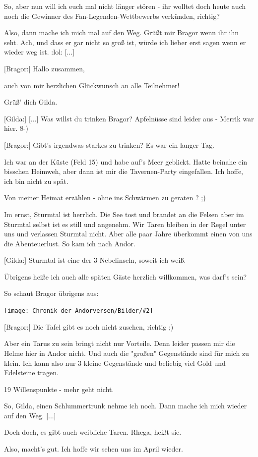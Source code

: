 \documentclass[10pt, a4paper, oneside]{book}
\newcommand{\bildmitts}[2][height=0.32\textwidth,width=0.48\textwidth,keepaspectratio]{%
    \begin{center}
        \texttt{[image: Chronik der Andorversen/Bilder/\#2]}
    \end{center}
}
\begin{document}
\begin{multicols}{2}
So, aber nun will ich euch mal nicht länger stören - ihr wolltet doch heute auch noch die Gewinner des Fan-Legenden-Wettbewerbs verkünden, richtig?

Also, dann mache ich mich mal auf den Weg. Grüßt mir Bragor wenn ihr ihn seht. Ach, und dass er gar nicht so groß ist, würde ich lieber erst sagen wenn er wieder weg ist. :lol: [...]

[Bragor:] Hallo zusammen,

auch von mir herzlichen Glückwunsch an alle Teilnehmer!

Grüß' dich Gilda.

[Gilda:] [...] Was willst du trinken Bragor? Apfelnüsse sind leider aus - Merrik war hier. 8-)

[Bragor:] Gibt's irgendwas starkes zu trinken? Es war ein langer Tag.

Ich war an der Küste (Feld 15) und habe auf's Meer geblickt. Hatte beinahe ein bisschen Heimweh, aber dann ist mir die Tavernen-Party eingefallen. Ich hoffe, ich bin nicht zu spät.

Von meiner Heimat erzählen - ohne ins Schwärmen zu geraten ? ;)

Im ernst, Sturmtal ist herrlich. Die See tost und brandet an die Felsen aber im Sturmtal selbst ist es still und angenehm. Wir Taren bleiben in der Regel unter uns und verlassen Sturmtal nicht. Aber alle paar Jahre überkommt einen von uns die Abenteuerlust. So kam ich nach Andor.

[Gilda:] Sturmtal ist eine der 3 Nebelinseln, soweit ich weiß.

Übrigens heiße ich auch alle späten Gäste herzlich willkommen, was darf's sein?

So schaut Bragor übrigens aus:

\bildmitts{Bragor.jpeg}

[Bragor:] Die Tafel gibt es noch nicht zusehen, richtig ;)

Aber ein Tarus zu sein bringt nicht nur Vorteile. Denn leider passen mir die Helme hier in Andor nicht. Und auch die "großen" Gegenstände sind für mich zu klein. Ich kann also nur 3 kleine Gegenstände und beliebig viel Gold und Edelsteine tragen.

19 Willenspunkte - mehr geht nicht.

So, Gilda, einen Schlummertrunk nehme ich noch. Dann mache ich mich wieder auf den Weg. [...]

Doch doch, es gibt auch weibliche Taren. Rhega, heißt sie.

Also, macht's gut. Ich hoffe wir sehen uns im April wieder.


\end{multicols}
\end{document}
